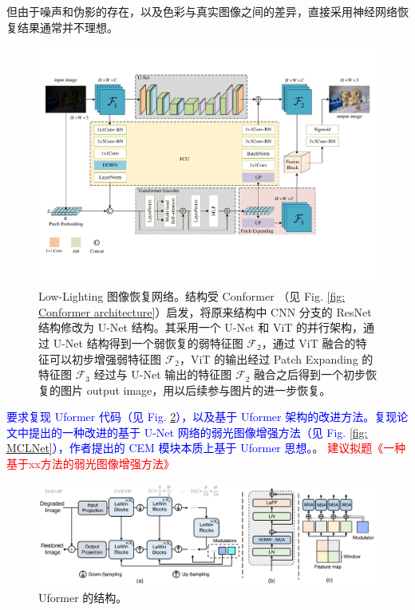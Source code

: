 \documentclass[a4paper, 10pt]{article}
\begin{document}
	但由于噪声和伪影的存在，以及色彩与真实图像之间的差异，直接采用神经网络恢复结果通常并不理想。
	
	\begin{figure}[htbp]
		\centering 
		\includegraphics[width=\columnwidth]{picture/LLIE/My Architecture/The proposed initial architecture}
		\caption{
			\label{fig: The proposed architecture} 
			Low-Lighting 图像恢复网络。结构受 Conformer\cite{peng2021conformer} （见 Fig. \ref{fig: Conformer architecture}）启发，将原来结构中 CNN 分支的 ResNet 结构修改为 U-Net 结构。其采用一个 U-Net 和 ViT 的并行架构，通过 U-Net 结构得到一个弱恢复的弱特征图 $\mathcal{F}_2$，通过 ViT 融合的特征可以初步增强弱特征图 $\mathcal{F}_2$，ViT 的输出经过 Patch Expanding 的特征图 $\mathcal{F}_3$ 经过与 U-Net 输出的特征图 $\mathcal{F}_2$ 融合之后得到一个初步恢复的图片 output image，用以后续参与图片的进一步恢复。
		}
	\end{figure}
	
	\textcolor{blue}{要求复现 Uformer\cite{wang2022uformer} 代码（见 Fig. \ref{fig: Uformer}），以及基于 Uformer 架构的改进方法\cite{li2023effective}。复现论文\cite{li2023effective}中提出的一种改进的基于 U-Net 网络的弱光图像增强方法（见 Fig. \ref{fig: MCLNet}），作者提出的 CEM 模块本质上基于 Uformer 思想。}。	
	\textcolor{red}{建议拟题《一种基于xx方法的弱光图像增强方法》}
	
	\begin{figure}[htbp]
		\centering 
		\includegraphics[width=\columnwidth]{picture/LLIE/Uformer/Uformer}
		\caption{
			\label{fig: Uformer} 
			Uformer 的结构。
		}
	\end{figure}
	
\end{document}
